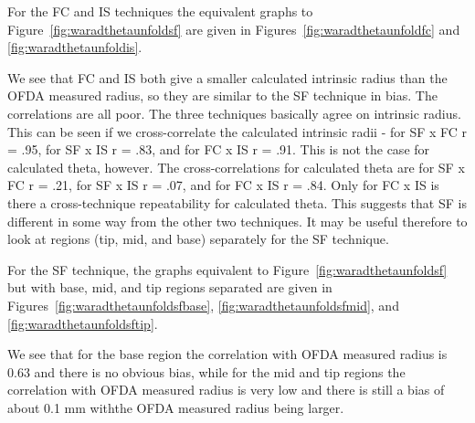 \documentclass[titlepage,10pt]{article}  %
\begin{document}
For the FC and IS techniques the equivalent graphs to Figure~\ref{fig:waradthetaunfoldsf} are given in Figures~\ref{fig:waradthetaunfoldfc} and \ref{fig:waradthetaunfoldis}.


We see that FC and IS both give a smaller calculated intrinsic radius than the OFDA measured radius, so they are similar to the SF technique in bias. The correlations are all poor. The three techniques basically agree on intrinsic radius. This can be seen if we cross-correlate the calculated intrinsic radii - for SF x FC r = .95, for SF x IS r = .83, and for FC x IS r = .91. This is not the case for calculated theta, however. The cross-correlations for calculated theta are for SF x FC r = .21, for SF x IS r = .07, and for FC x IS r = .84. Only for FC x IS is there a cross-technique repeatability for calculated theta. This suggests that SF is different in some way from the other two techniques. It may be useful therefore to look at regions (tip, mid, and base) separately for the SF technique.

For the SF technique, the graphs equivalent to Figure~\ref{fig:waradthetaunfoldsf} but with base, mid, and tip regions separated are given in Figures~\ref{fig:waradthetaunfoldsfbase}, \ref{fig:waradthetaunfoldsfmid}, and \ref{fig:waradthetaunfoldsftip}.



We see that for the base region the correlation with OFDA measured radius is 0.63 and there is no obvious bias, while for the mid and tip regions the correlation with OFDA measured radius is very low and there is still a bias of about 0.1 mm withthe OFDA measured radius being larger.
\end{document}
